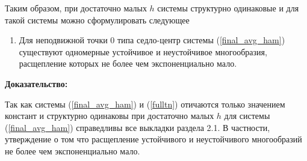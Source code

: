 Таким образом, при достаточно малых $h$ системы структурно одинаковые и для такой системы можно сформулировать следующее
\begin{utv}
\begin{enumerate}
\item Для неподвижной точки $0$ типа седло-центр системы (\ref{final_avg_ham}) существуют одномерные устойчивое и неустойчивое многообразия, расщепление которых не более чем экспоненциально мало.
\end{enumerate}
\end{utv}
\textbf{Доказательство:}\nopagebreak[4]

Так как системы (\ref{final_avg_ham}) и (\ref{fulltn}) отичаются только значением констант и структурно одинаковы при достаточно малых $h$ для системы (\ref{final_avg_ham}) справедливы все выкладки раздела 2.1. В частности, утверждение о том что расщепление устойчивого и неустойчивого многообразий не более чем экспоненциально мало.

